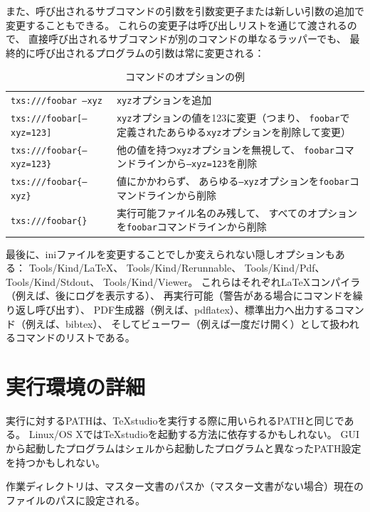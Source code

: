 また、呼び出されるサブコマンドの引数を引数変更子または新しい引数の追加で変更することもできる。
これらの変更子は呼び出しリストを通じて渡されるので、
直接呼び出されるサブコマンドが別のコマンドの単なるラッパーでも、
最終的に呼び出されるプログラムの引数は常に変更される：

\begin{table}[H]
  \centering
  \caption{コマンドのオプションの例}
  \begin{tabularx}{\linewidth}{lX}
    \hline
    \texttt{txs:///foobar --xyz} & \texttt{xyz}オプションを追加\\
    \texttt{txs:///foobar{[}--xyz=123{]}}
      & \texttt{xyz}オプションの値を123に変更（つまり、
      \texttt{foobar}で定義されたあらゆる\texttt{xyz}オプションを削除して変更）\\
    \texttt{txs:///foobar\{--xyz=123\}}
      & 他の値を持つ\texttt{xyz}オプションを無視して、
      \texttt{foobar}コマンドラインから\texttt{--xyz=123}を削除\\
    \texttt{txs:///foobar\{--xyz\}} & 値にかかわらず、
      あらゆる\texttt{--xyz}オプションを\texttt{foobar}コマンドラインから削除\\
    \texttt{txs:///foobar\{\}} & 実行可能ファイル名のみ残して、
      すべてのオプションを\texttt{foobar}コマンドラインから削除\\
    \hline
  \end{tabularx}
\end{table}

最後に、iniファイルを変更することでしか変えられない隠しオプションもある：
Tools/Kind/LaTeX、 Tools/Kind/Rerunnable、 Tools/Kind/Pdf、
Tools/Kind/Stdout、 Tools/Kind/Viewer。
これらはそれぞれLaTeXコンパイラ（例えば、後にログを表示する）、
再実行可能（警告がある場合にコマンドを繰り返し呼び出す）、
PDF生成器（例えば、pdflatex）、標準出力へ出力するコマンド（例えば、bibtex）、
そしてビューワー（例えば一度だけ開く）として扱われるコマンドのリストである。

\section{実行環境の詳細}

実行に対するPATHは、TeXstudioを実行する際に用いられるPATHと同じである。
Linux/OS XではTeXstudioを起動する方法に依存するかもしれない。
GUIから起動したプログラムはシェルから起動したプログラムと異なったPATH設定を持つかもしれない。

作業ディレクトリは、マスター文書のパスか（マスター文書がない場合）現在のファイルのパスに設定される。

